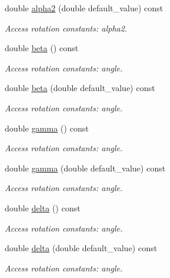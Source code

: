 \begin{DoxyCompactItemize}
double \hyperlink{struct_d_d4hep_1_1_x_m_l_1_1_dimension_ae93e218271e075f343081e31f857ed55}{alpha2} (double default\+\_\+value) const
\begin{DoxyCompactList}\small\item\em Access rotation constants\+: alpha2. \end{DoxyCompactList}\item 
double \hyperlink{struct_d_d4hep_1_1_x_m_l_1_1_dimension_ae6afdb409f273112033a6ed34283506a}{beta} () const
\begin{DoxyCompactList}\small\item\em Access rotation constants\+: angle. \end{DoxyCompactList}\item 
double \hyperlink{struct_d_d4hep_1_1_x_m_l_1_1_dimension_ad2b27c1e138de4f3b32ad241e410c443}{beta} (double default\+\_\+value) const
\begin{DoxyCompactList}\small\item\em Access rotation constants\+: angle. \end{DoxyCompactList}\item 
double \hyperlink{struct_d_d4hep_1_1_x_m_l_1_1_dimension_a32543935ed14ad6c71ace2c4d1ddd3a8}{gamma} () const
\begin{DoxyCompactList}\small\item\em Access rotation constants\+: angle. \end{DoxyCompactList}\item 
double \hyperlink{struct_d_d4hep_1_1_x_m_l_1_1_dimension_a1d5eb6ffc0d944c63d5f748d92d508d2}{gamma} (double default\+\_\+value) const
\begin{DoxyCompactList}\small\item\em Access rotation constants\+: angle. \end{DoxyCompactList}\item 
double \hyperlink{struct_d_d4hep_1_1_x_m_l_1_1_dimension_adc94bde2c46bd2e31c683362faa5fd19}{delta} () const
\begin{DoxyCompactList}\small\item\em Access rotation constants\+: angle. \end{DoxyCompactList}\item 
double \hyperlink{struct_d_d4hep_1_1_x_m_l_1_1_dimension_aba39a53221f8c9e76038fd009ebe20e4}{delta} (double default\+\_\+value) const
\begin{DoxyCompactList}\small\item\em Access rotation constants\+: angle. \end{DoxyCompactList}\item 

\end{DoxyCompactItemize}
